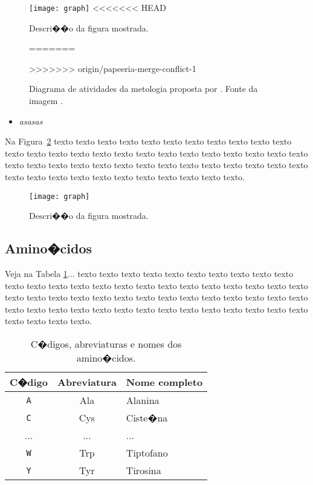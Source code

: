 \begin{figure}[!h]
  \centering
  \texttt{[image: graph]} 
<<<<<<< HEAD
  \caption{Descri��o da figura mostrada.}
  \label{fig:humanbeta} 
=======
  \caption{Diagrama de atividades da metologia proposta por 
    \cite{guizzardidesenvolvimento}. Fonte da imagem \cite{morais2007ontologias}. 
  }
  \label{fig:diagrama_metodologia} 
>>>>>>> origin/papeeria-merge-conflict-1
\end{figure}

\begin{itemize}
    \item \textit{asasas}
    
\end{itemize}



Na Figura~\ref{fig:humanbeta} texto texto texto texto texto texto texto texto
texto texto texto texto texto texto texto texto texto texto texto texto texto
texto texto texto texto texto texto texto texto texto texto texto texto texto
texto texto texto texto texto texto texto texto texto texto texto texto texto
texto texto texto.

\begin{figure}[!h]
  \centering
  \texttt{[image: graph]} 
  \caption{Descri��o da figura mostrada.}
  \label{fig:humanbeta} 
\end{figure}

\subsection{Amino�cidos}
\label{sec:amino_acidos}

Veja na Tabela \ref{tab:amino_acidos}...  texto texto texto texto texto texto
texto texto texto texto texto texto texto texto texto texto texto texto texto
texto texto texto texto texto texto texto texto texto texto texto texto texto
texto texto texto texto texto texto texto texto texto texto texto texto texto
texto texto texto texto texto texto texto texto texto texto texto.

\begin{table}[!t]
\begin{center}
    \begin{tabular}{c|c|l}
	 \hline
	 C�digo & Abreviatura & Nome completo \\ \hline
     \texttt{A} & Ala & Alanina \\
     \texttt{C} & Cys & Ciste�na \\
     ...        & ... & ... \\
     \texttt{W} & Trp & Tiptofano \\
     \texttt{Y} & Tyr & Tirosina \\ \hline
    \end{tabular}
  \caption{C�digos, abreviaturas e nomes dos amino�cidos.}
  \label{tab:amino_acidos}
\end{center}
\end{table}

